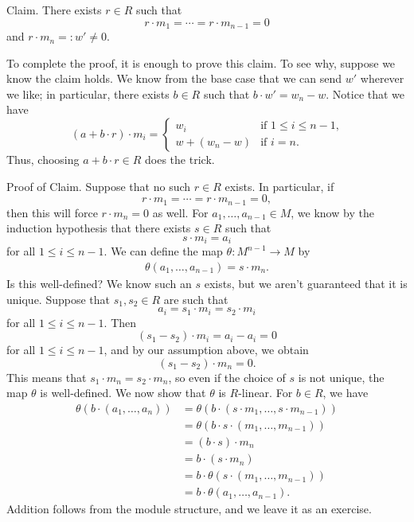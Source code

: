 \begin{enumerate}[(1)]
    {\sc Claim.} There exists $r \in R$ such that 
    \[ r \cdot m_1 = \cdots = r \cdot m_{n-1} = 0 \]
    and $r \cdot m_n =: w' \neq 0$. 
    
    To complete the proof, it is enough to prove this claim. To see why, suppose we know the claim holds. 
    We know from the base case 
    that we can send $w'$ wherever we like; in particular, there exists $b \in R$ such that 
    $b \cdot w' = w_n - w$. Notice that we have 
    \[ (a + b \cdot r) \cdot m_i = \begin{cases}
    w_i & \text{if $1 \leq i \leq n-1$,} \\ w + (w_n - w) & \text{if $i = n$.} \end{cases} \]
    Thus, choosing $a + b \cdot r \in R$ does the trick.
    
    {\sc Proof of Claim.} Suppose that no such $r \in R$ exists. In particular, if 
    \[ r \cdot m_1 = \cdots = r \cdot m_{n-1} = 0, \]
    then this will force $r \cdot m_n = 0$ as well. For $a_1, \dots, a_{n-1} \in M$, we know by the induction hypothesis that there exists 
    $s \in R$ such that 
    \[ s \cdot m_i = a_i \]
    for all $1 \leq i \leq n-1$. We can define the map $\theta : M^{n-1} \to M$ by 
    \begin{align*}
        \theta(a_1, \dots, a_{n-1}) = s \cdot m_n. 
    \end{align*}  
    Is this well-defined? We know such an $s$ exists, but we aren't guaranteed that it is unique. 
    Suppose that $s_1, s_2 \in R$ are such that 
    \[ a_i = s_1 \cdot m_i = s_2 \cdot m_i \]
    for all $1 \leq i \leq n-1$. Then 
    \[ (s_1 - s_2) \cdot m_i = a_i - a_i = 0 \] 
    for all 
    $1 \leq i \leq n-1$, and by our assumption above, we obtain 
    \[ (s_1 - s_2) \cdot m_n = 0. \]
    This means that $s_1 \cdot m_n = s_2 \cdot m_n$, so even if the choice of $s$ is not unique, the 
    map $\theta$ is well-defined. We now show that $\theta$ is $R$-linear. For $b \in R$, we have 
    \begin{align*}
        \theta(b \cdot (a_1, \dots, a_n)) 
        &= \theta(b \cdot (s \cdot m_1, \dots, s \cdot m_{n-1})) \\
        &= \theta(b \cdot s \cdot (m_1, \dots, m_{n-1})) \\
        &= (b \cdot s) \cdot m_n \\
        &= b \cdot (s \cdot m_n) \\
        &= b \cdot \theta(s \cdot (m_1, \dots, m_{n-1})) \\
        &= b \cdot \theta(a_1, \dots, a_{n-1}).
    \end{align*}
    Addition follows from the module structure, and we leave it as an exercise.
    

\end{enumerate}
